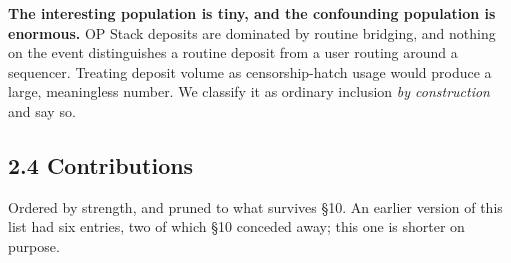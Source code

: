 \documentclass[conference]{IEEEtran}
\renewcommand{\_}{\textunderscore\allowbreak}
\begin{document}
\textbf{The interesting population is tiny, and the confounding
population is enormous.} OP Stack deposits are dominated by routine
bridging, and nothing on the event distinguishes a routine deposit from
a user routing around a sequencer. Treating deposit volume as
censorship-hatch usage would produce a large, meaningless number. We
classify it as ordinary inclusion \emph{by construction} and say so.

\subsection{2.4 Contributions}\label{contributions}

Ordered by strength, and pruned to what survives §10. An earlier version
of this list had six entries, two of which §10 conceded away; this one
is shorter on purpose.
\end{document}

